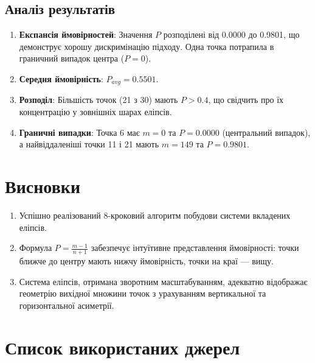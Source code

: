 \documentclass[12pt,a4paper]{article}
\begin{document}
\subsection{Аналіз результатів}

\begin{enumerate}
    \item \textbf{Експансія ймовірностей}: Значення $P$ розподілені від 0.0000 до 0.9801, що демонструє хорошу дискримінацію підходу. Одна точка потрапила в граничний випадок центра ($P=0$).
    
    \item \textbf{Середня ймовірність}: $P_{avg} = 0.5501$.
    
    \item \textbf{Розподіл}: Більшість точок (21 з 30) мають $P > 0.4$, що свідчить про їх концентрацію у зовнішніх шарах еліпсів.
    
    \item \textbf{Граничні випадки}: Точка 6 має $m = 0$ та $P = 0.0000$ (центральний випадок), а найвіддаленіші точки 11 і 21 мають $m = 149$ та $P = 0.9801$.
\end{enumerate}

\section{Висновки}

\begin{enumerate}
    \item Успішно реалізований 8-кроковий алгоритм побудови системи вкладених еліпсів.
    
    \item Формула $P = \frac{m-1}{n+1}$ забезпечує інтуїтивне представлення ймовірності: точки ближче до центру мають нижчу ймовірність, точки на краї — вищу.
    
    \item Система еліпсів, отримана зворотним масштабуванням, адекватно відображає геометрію вихідної множини точок з урахуванням вертикальної та горизонтальної асиметрії.
\end{enumerate}

\section{Список використаних джерел}
\end{document}
